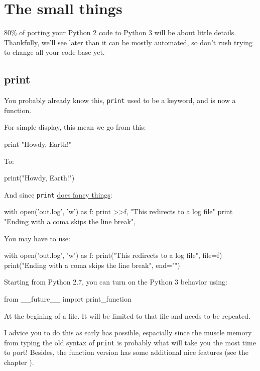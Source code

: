 
\chapter{The small things}

80\% of porting your Python 2 code to Python 3 will be about little details. Thankfully, we'll see later than it can be mostly automated, so don't rush trying to change all your code base yet.

\section{print}

You probably already know this, \lstinline{print} used to be a keyword, and is now a function.

For simple display, this mean we go from this:

\begin{py}
print "Howdy, Earth!"
\end{py}


To:

\begin{py}
print("Howdy, Earth!")
\end{py}

And since \lstinline{print} \href{https://www.python.org/dev/peps/pep-0214/}{does fancy things}:

\begin{py}
with open('out.log', 'w') as f:
    print >>f, "This redirects to a log file"
print "Ending with a coma skips the line break",
\end{py}

You may have to use:

\begin{py}
with open('out.log', 'w') as f:
    print("This redirects to a log file", file=f)
print("Ending with a coma skips the line break", end="")
\end{py}

Starting from Python 2.7, you can turn on the Python 3 behavior using:

\begin{py}
from __future__ import print_function
\end{py}

At the begining of a file. It will be limited to that file and needs to be repeated.

I advice you to do this as early has possible, espacially since the muscle memory from typing the old syntax of \lstinline{print} is probably what will take you the most time to port! Besides, the function version has some additional nice features (see the chapter ).

